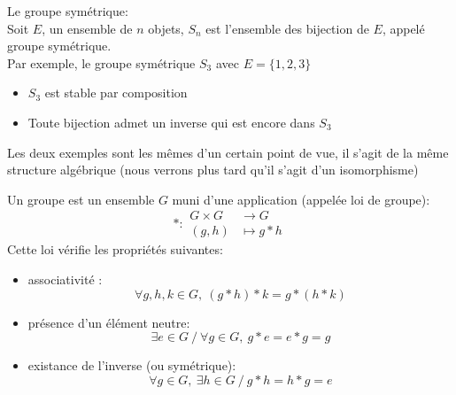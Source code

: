 \documentclass[../main.tex]{subfile}
\begin{document}
\begin{ex}
	Le groupe symétrique:\\
	Soit $E$, un ensemble de $n$ objets, $S_n$ est l'ensemble des bijection de $E$, appelé groupe symétrique.\\
	Par exemple, le groupe symétrique $S_3$ avec $E = \{1, 2, 3\}$

\begin{rema}	
\begin{itemize}	
	\item $S_3$ est stable par composition
	\item Toute bijection admet un inverse qui est encore dans $S_3$
\end{itemize}
\end{rema}

\begin{rema}
	Les deux exemples sont les mêmes d'un certain point de vue, il s'agit de la même structure algébrique (nous verrons plus tard qu'il s'agit d'un isomorphisme)
\end{rema}
\end{ex}

\begin{defi}
	Un groupe est un ensemble $G$ muni d'une application (appelée loi de groupe):
	$$
*: 
\begin{aligned}
	G \times G &\to G\\
	(g, h) &\mapsto g * h
\end{aligned}
	$$
	Cette loi vérifie les propriétés suivantes:
\begin{itemize}	
	\item associativité : 
	$$\forall g, h, k \in G, \ (g*h)*k = g*(h*k)$$
	\item présence d'un élément neutre:
	$$\exists e \in G \ / \ \forall g \in G, \ g * e = e * g = g$$
	\item existance de l'inverse (ou symétrique):
	$$\forall g \in G, \ \exists h \in G \ / \ g * h = h* g = e$$
\end{itemize}
\end{defi}
\end{document}
